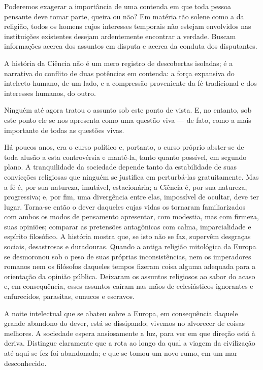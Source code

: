 \documentclass[11pt,a5paper,twoside,openany]{book}
\begin{document}
Poderemos exagerar a importância de uma contenda em que toda pessoa pensante deve tomar parte, queira ou não? Em matéria tão solene como a da religião, todos os homens cujos interesses temporais não estejam envolvidos nas instituições existentes desejam ardentemente encontrar a verdade. Buscam informações acerca dos assuntos em disputa e acerca da conduta dos disputantes.

A história da Ciência não é um mero registro de descobertas isoladas; é a narrativa do conflito de duas potências em contenda: a força expansiva do intelecto humano, de um lado, e a compressão proveniente da fé tradicional e dos interesses humanos, do outro.

Ninguém até agora tratou o assunto sob este ponto de vista. E, no entanto, sob este ponto ele se nos apresenta como uma questão viva — de fato, como a mais importante de todas as questões vivas.

Há poucos anos, era o curso político e, portanto, o curso próprio abster-se de toda alusão a esta controvérsia e mantê-la, tanto quanto possível, em segundo plano. A tranquilidade da sociedade depende tanto da estabilidade de suas convicções religiosas que ninguém se justifica em perturbá-las gratuitamente. Mas a fé é, por sua natureza, imutável, estacionária; a Ciência é, por sua natureza, progressiva; e, por fim, uma divergência entre elas, impossível de ocultar, deve ter lugar. Torna-se então o dever daqueles cujas vidas os tornaram familiarizados com ambos os modos de pensamento apresentar, com modestia, mas com firmeza, suas opiniões; comparar as pretensões antagônicas com calma, imparcialidade e espírito filosófico. A história mostra que, se isto não se faz, supervêm desgraças sociais, desastrosas e duradouras. Quando a antiga religião mitológica da Europa se desmoronou sob o peso de suas próprias inconsistências, nem os imperadores romanos nem os filósofos daqueles tempos fizeram coisa alguma adequada para a orientação da opinião pública. Deixaram os assuntos religiosos ao sabor do acaso e, em consequência, esses assuntos caíram nas mãos de eclesiásticos ignorantes e enfurecidos, parasitas, eunucos e escravos.

A noite intelectual que se abateu sobre a Europa, em consequência daquele grande abandono do dever, está se dissipando; vivemos no alvorecer de coisas melhores. A sociedade espera ansiosamente a luz, para ver em que direção está à deriva. Distingue claramente que a rota ao longo da qual a viagem da civilização até aqui se fez foi abandonada; e que se tomou um novo rumo, em um mar desconhecido.
\end{document}
